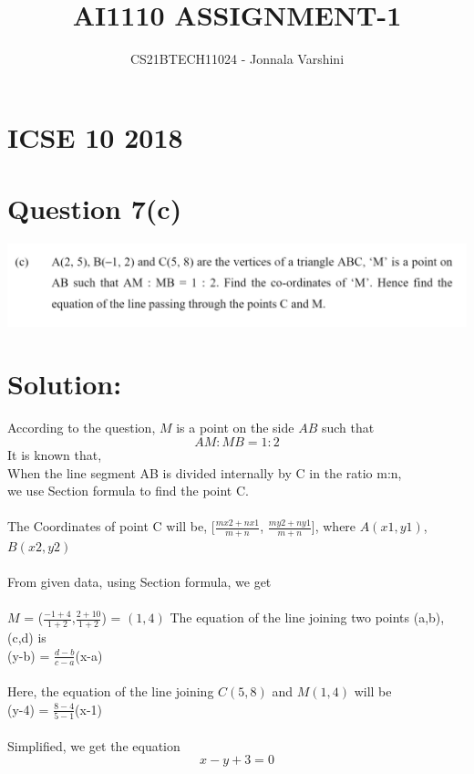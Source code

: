 \documentclass[12pt]{article}
\title{AI1110 ASSIGNMENT-1}
\author{CS21BTECH11024 - Jonnala Varshini}
\begin{document}
\maketitle
\section*{ICSE 10 2018}
\section*{Question 7(c)}
\includegraphics[width=\textwidth]{prv1a.png}
\section*{Solution:}
According to the question, $M$ is a point on the side $AB$ such that $$AM : MB = 1 : 2$$
It is known that, \\
    When the line segment AB is divided internally by C in the ratio m:n,\\
we use Section formula to find the point C.\\\\
The Coordinates of point C will be,
  [$\frac{mx2+nx1}{m+n}$, $\frac{my2+ny1}{m+n}$], where $A(x1,y1)$,$B(x2,y2)$ \\\\
From given data, using Section formula, we get\\\\
    $M$ = ($\frac{-1+4}{1+2}$,$\frac{2+10}{1+2}$) = $(1,4)$\newpage
The equation of the line joining two points (a,b),(c,d) is \\
        (y-b) = {$\frac{d-b}{c-a}$}(x-a)\\\\
Here, the equation of the line joining $C(5,8)$ and $M(1,4)$ will be\\
      (y-4) = $\frac{8-4}{5-1}$(x-1) \\\\
Simplified, we get the equation $$x-y+3=0$$
\end{document}
